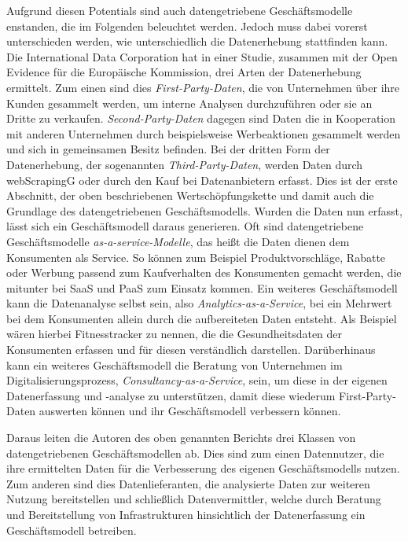 \noindent Aufgrund diesen Potentials sind auch datengetriebene Geschäftsmodelle enstanden, die im Folgenden beleuchtet werden. Jedoch muss dabei vorerst unterschieden werden, wie unterschiedlich die Datenerhebung stattfinden kann. Die International Data Corporation hat in einer Studie, zusammen mit der Open Evidence für die Europäische Kommission, drei Arten der Datenerhebung ermittelt. Zum einen sind dies \textit{First-Party-Daten}, die von Unternehmen über ihre Kunden gesammelt werden, um interne Analysen durchzuführen oder sie an Dritte zu verkaufen. \textit{Second-Party-Daten} dagegen sind Daten die in Kooperation mit anderen Unternehmen durch beispielsweise Werbeaktionen gesammelt werden und sich in gemeinsamen Besitz befinden. Bei der dritten Form der Datenerhebung, der sogenannten \textit{Third-Party-Daten}, werden Daten durch \gls{webScrapingG} oder durch den Kauf bei Datenanbietern erfasst. Dies ist der erste Abschnitt, der oben beschriebenen Wertschöpfungskette und damit auch die Grundlage des datengetriebenen Geschäftsmodells. Wurden die Daten nun erfasst, lässt sich ein Geschäftsmodell daraus generieren. Oft sind datengetriebene Geschäftsmodelle \textit{\glqq as-a-service\grqq{}-Modelle}, das heißt die Daten dienen dem Konsumenten als Service. So können zum Beispiel Produktvorschläge, Rabatte oder Werbung passend zum Kaufverhalten des Konsumenten gemacht werden, die mitunter bei \gls{SaaS} und \gls{PaaS} zum Einsatz kommen. Ein weiteres Geschäftsmodell kann die Datenanalyse selbst sein, also \textit{Analytics-as-a-Service}, bei ein Mehrwert bei dem Konsumenten allein durch die aufbereiteten Daten entsteht. Als Beispiel wären hierbei Fitnesstracker zu nennen, die die Gesundheitsdaten der Konsumenten erfassen und für diesen verständlich darstellen. Darüberhinaus kann ein weiteres Geschäftsmodell die Beratung von Unternehmen im Digitalisierungsprozess, \textit{Consultancy-as-a-Service}, sein, um diese in der eigenen Datenerfassung und -analyse zu unterstützen, damit diese wiederum First-Party-Daten auswerten können und ihr Geschäftsmodell verbessern können. \newline

\noindent Daraus leiten die Autoren des oben genannten Berichts drei Klassen von datengetriebenen Geschäftsmodellen ab. Dies sind zum einen Datennutzer, die ihre ermittelten Daten für die Verbesserung des eigenen Geschäftsmodells nutzen. Zum anderen sind dies Datenlieferanten, die analysierte Daten zur weiteren Nutzung bereitstellen und schließlich Datenvermittler, welche durch Beratung und Bereitstellung von Infrastrukturen hinsichtlich der Datenerfassung ein Geschäftsmodell betreiben. \cite{smart_2013} \newline
